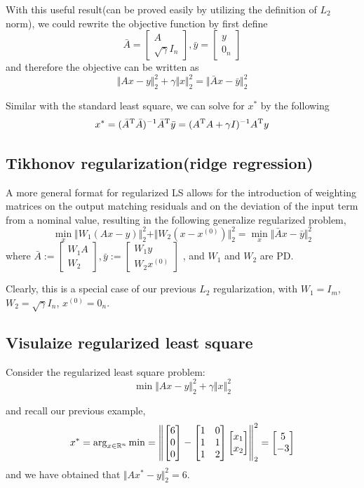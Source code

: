 With this useful result(can be proved easily by utilizing the definition of $L_2$ norm), we could rewrite the objective function by first define
$$
\bar{A}=
\begin{bmatrix}
A\\
\sqrt{\gamma} I_n
\end{bmatrix}
,
\bar{y}=
\begin{bmatrix}
y\\
0_n
\end{bmatrix}
$$
and therefore the objective can be written as
$$\Vert Ax - y\Vert ^2_2 + \gamma \Vert x\Vert ^2_2=\Vert \bar{A}x-\bar{y}\Vert^2_2$$

Similar with the standard least square, we can solve for $x^*$ by the following
$$x^*=(\bar{A}^{{\rm T}} \bar{A})^{-1} \bar{A}^{{\rm T}} \bar{y}=(A^{{\rm T}} A+\gamma I)^{-1} A^{{\rm T}} y$$

\subsection{Tikhonov regularization(ridge regression)}
A more general format for regularized LS allows for the introduction of weighting matrices on the
output matching residuals and on the deviation of the input term from a nominal value, resulting in the following generalize regularized problem,
$$\min_x \Vert W_1 (Ax - y)\Vert^2_2 + \Vert W_2 (x - x^{(0)})\Vert^2_2 = \min_x \Vert \bar{A}x-\bar{y}\Vert^2_2 $$
where $\bar{A} := 
\begin{bmatrix}
W_1 A\\
W_2
\end{bmatrix}
,
\bar{y} := 
\begin{bmatrix}
	W_1 y\\
	W_2 x^{(0)}
\end{bmatrix}
$
, and $W_1$ and $W_2$ are PD.

Clearly, this is a special case of our previous $L_2$ regularization, with $W_1 = I_m$, $W_2 = \sqrt{\gamma} I_n$, $x^{(0)}= 0_n$.

\subsection{Visulaize regularized least square}
Consider the regularized least square problem: 
$$\min \Vert Ax-y\Vert_2^2 +\gamma \Vert x\Vert^2_2$$

and recall our previous example, 
$$x^*= \arg_{x\in \mathbb{R}^n} \min =
\left\Vert
\begin{bmatrix}
6\\
0\\
0
\end{bmatrix}
-
\begin{bmatrix}
1&0\\
1&1\\
1&2
\end{bmatrix}
\begin{bmatrix}
x_1\\
x_2
\end{bmatrix}
\right\Vert^2_2
=
\begin{bmatrix}
5\\
-3
\end{bmatrix}
$$
and we have obtained that $\Vert Ax^*-y\Vert_2^2 = 6$.


